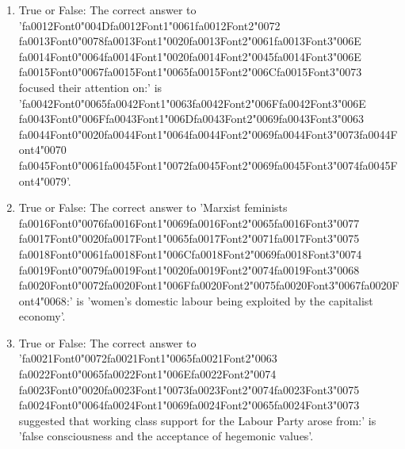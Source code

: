 \documentclass[12pt]{article}
\begin{document}
\begin{enumerate}[label=\arabic*.]
\item True or False: The correct answer to '{\csname fa0012Font0\endcsname\char"004D}{\csname fa0012Font1\endcsname\char"0061}{\csname fa0012Font2\endcsname\char"0072} {\csname fa0013Font0\endcsname\char"0078}{\csname fa0013Font1\endcsname\char"0020}{\csname fa0013Font2\endcsname\char"0061}{\csname fa0013Font3\endcsname\char"006E} {\csname fa0014Font0\endcsname\char"0064}{\csname fa0014Font1\endcsname\char"0020}{\csname fa0014Font2\endcsname\char"0045}{\csname fa0014Font3\endcsname\char"006E} {\csname fa0015Font0\endcsname\char"0067}{\csname fa0015Font1\endcsname\char"0065}{\csname fa0015Font2\endcsname\char"006C}{\csname fa0015Font3\endcsname\char"0073} focused their attention on:' is '{\csname fa0042Font0\endcsname\char"0065}{\csname fa0042Font1\endcsname\char"0063}{\csname fa0042Font2\endcsname\char"006F}{\csname fa0042Font3\endcsname\char"006E} {\csname fa0043Font0\endcsname\char"006F}{\csname fa0043Font1\endcsname\char"006D}{\csname fa0043Font2\endcsname\char"0069}{\csname fa0043Font3\endcsname\char"0063} {\csname fa0044Font0\endcsname\char"0020}{\csname fa0044Font1\endcsname\char"0064}{\csname fa0044Font2\endcsname\char"0069}{\csname fa0044Font3\endcsname\char"0073}{\csname fa0044Font4\endcsname\char"0070} {\csname fa0045Font0\endcsname\char"0061}{\csname fa0045Font1\endcsname\char"0072}{\csname fa0045Font2\endcsname\char"0069}{\csname fa0045Font3\endcsname\char"0074}{\csname fa0045Font4\endcsname\char"0079}'.
\item True or False: The correct answer to 'Marxist feminists {\csname fa0016Font0\endcsname\char"0076}{\csname fa0016Font1\endcsname\char"0069}{\csname fa0016Font2\endcsname\char"0065}{\csname fa0016Font3\endcsname\char"0077} {\csname fa0017Font0\endcsname\char"0020}{\csname fa0017Font1\endcsname\char"0065}{\csname fa0017Font2\endcsname\char"0071}{\csname fa0017Font3\endcsname\char"0075} {\csname fa0018Font0\endcsname\char"0061}{\csname fa0018Font1\endcsname\char"006C}{\csname fa0018Font2\endcsname\char"0069}{\csname fa0018Font3\endcsname\char"0074} {\csname fa0019Font0\endcsname\char"0079}{\csname fa0019Font1\endcsname\char"0020}{\csname fa0019Font2\endcsname\char"0074}{\csname fa0019Font3\endcsname\char"0068} {\csname fa0020Font0\endcsname\char"0072}{\csname fa0020Font1\endcsname\char"006F}{\csname fa0020Font2\endcsname\char"0075}{\csname fa0020Font3\endcsname\char"0067}{\csname fa0020Font4\endcsname\char"0068}:' is 'women's domestic labour being exploited by the capitalist economy'.
\item True or False: The correct answer to '{\csname fa0021Font0\endcsname\char"0072}{\csname fa0021Font1\endcsname\char"0065}{\csname fa0021Font2\endcsname\char"0063} {\csname fa0022Font0\endcsname\char"0065}{\csname fa0022Font1\endcsname\char"006E}{\csname fa0022Font2\endcsname\char"0074} {\csname fa0023Font0\endcsname\char"0020}{\csname fa0023Font1\endcsname\char"0073}{\csname fa0023Font2\endcsname\char"0074}{\csname fa0023Font3\endcsname\char"0075} {\csname fa0024Font0\endcsname\char"0064}{\csname fa0024Font1\endcsname\char"0069}{\csname fa0024Font2\endcsname\char"0065}{\csname fa0024Font3\endcsname\char"0073} suggested that working class support for the Labour Party arose from:' is 'false consciousness and the acceptance of hegemonic values'.

\end{enumerate}
\end{document}
